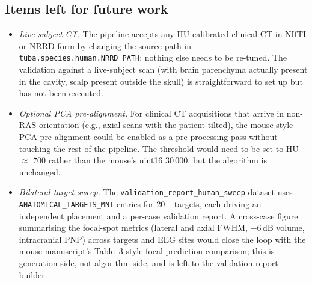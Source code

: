 \documentclass{compactarticle}
\begin{document}
\subsection{Items left for future work}
\begin{itemize}
\item {\em Live-subject CT.} The pipeline accepts any HU-calibrated
  clinical CT in NIfTI or NRRD form by changing the source path in
  \texttt{tuba.species.human.NRRD\_PATH}; nothing else needs to be
  re-tuned. The validation against a live-subject scan (with brain
  parenchyma actually present in the cavity, scalp present outside
  the skull) is straightforward to set up but has not been executed.
\item {\em Optional PCA pre-alignment.} For clinical CT acquisitions
  that arrive in non-RAS orientation (e.g., axial scans with the
  patient tilted), the mouse-style PCA pre-alignment could be enabled
  as a pre-processing pass without touching the rest of the pipeline.
  The threshold would need to be set to HU $\approx$ 700 rather than
  the mouse's uint16 30\,000, but the algorithm is unchanged.
\item {\em Bilateral target sweep.} The
  \texttt{validation\_report\_human\_sweep} dataset uses
  \texttt{ANATOMICAL\_TARGETS\_MNI} entries for 20+ targets, each
  driving an independent placement and a per-case validation report.
  A cross-case figure summarising the focal-spot metrics (lateral and
  axial FWHM, $-6$\,dB volume, intracranial PNP) across targets and
  EEG sites would close the loop with the mouse manuscript's
  Table~3-style focal-prediction comparison; this is generation-side,
  not algorithm-side, and is left to the validation-report builder.
\end{itemize}
\end{document}
